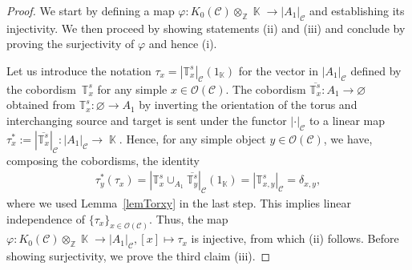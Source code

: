\documentclass[pdftex]{sigma}
\DeclareMathOperator{\K}{\mathbb{K}}
\DeclareMathOperator{\calc}{\mathcal{C}}
\numberwithin{equation}{section}
\theoremstyle{definition}
\begin{document}
\begin{proof}
 We start by defining a map $\varphi\colon K_0(\mathcal{C}) \otimes_{\mathbb{Z}} \K \rightarrow |A_1|_{\mathcal{C}}$ and establishing its injectivity. We then proceed by showing statements (ii) and (iii) and conclude by proving the surjectivity of $\varphi$ and hence (i).

 Let us introduce the notation $\tau_x = |\mathbb{T}_x^s|_{\mathcal{C}}(1_{\K})$ for the vector in $|A_1|_{\calc}$ defined by the cobor\-dism~$\mathbb{T}_x^s$ for any simple $x \in \mathcal{O}(\mathcal{C})$. The cobordism $\overline{\mathbb{T}_x^s}\colon A_1 \rightarrow \varnothing $ obtained from $\mathbb{T}_x^s\colon \varnothing \rightarrow A_1$ by inverting the orientation of the torus and interchanging source and target is sent under the functor $|\cdot|_{\mathcal{C}}$ to a linear map $\tau_x^*:= \left|\overline{\mathbb{T}_x^s}\right|_{\mathcal{C}}\colon |A_1|_{\mathcal{C}} \rightarrow \K$. Hence, for any simple object $y \in \mathcal{O}(\mathcal{C})$, we have, composing the cobordisms, the identity
 \begin{align*}
 \tau_y^*(\tau_x) = \left| \mathbb{T}_x^s \cup_{A_1} \overline{\mathbb{T}_y^s}\right|_{\mathcal{C}}(1_{\K}) = |\mathbb{T}_{x,y}^s|_{\mathcal{C}} = \delta_{x,y},
 \end{align*}
 where we used Lemma~\ref{lemTorxy} in the last step. This implies linear independence of $\{\tau_x\}_{x \in \mathcal{O}(\mathcal{C})}$. Thus, the map $\varphi\colon K_0(\mathcal{C}) \otimes_{\mathbb{Z}} \K \rightarrow |A_1|_{\mathcal{C}}, [x] \mapsto \tau_x$ is injective, from which (ii) follows. Before showing surjectivity, we prove the third claim (iii).


\end{proof}
\end{document}
